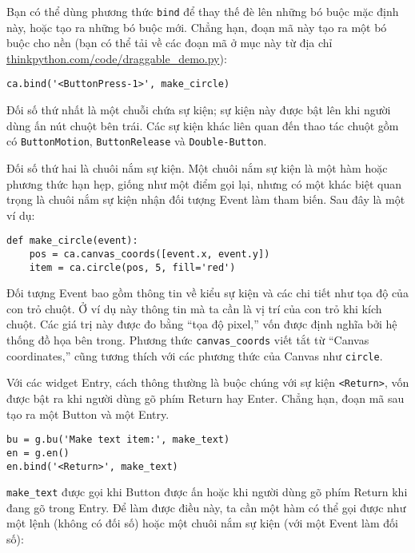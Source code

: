 \documentclass[11pt]{book}
\begin{document}
Bạn có thể dùng phương thức {\tt bind} để thay thế đè lên những
bó buộc mặc định này, hoặc tạo ra những bó buộc mới. Chẳng hạn,
đoạn mã này tạo ra một bó buộc cho nền (bạn có thể tải về các
đoạn mã ở mục này từ địa chỉ \url{thinkpython.com/code/draggable_demo.py}):

\beforeverb
\begin{verbatim}
ca.bind('<ButtonPress-1>', make_circle)
\end{verbatim}
\afterverb
%
Đối số thứ nhất là một chuỗi chứa sự kiện; sự kiện này được
bật lên khi người dùng ấn nút chuột bên trái. Các sự kiện khác
liên quan đến thao tác chuột gồm có {\tt ButtonMotion}, {\tt ButtonRelease} và
{\tt Double-Button}.


Đối số thứ hai là chuôi nắm sự kiện. Một chuôi nắm sự kiện là một
hàm hoặc phương thức hạn hẹp, giống như một điểm gọi lại, nhưng có một
khác biệt quan trọng là chuôi nắm sự kiện nhận đối tượng Event làm
tham biến. Sau đây là một ví dụ:

\beforeverb
\begin{verbatim}
def make_circle(event):
    pos = ca.canvas_coords([event.x, event.y])
    item = ca.circle(pos, 5, fill='red')
\end{verbatim}
\afterverb
%
Đối tượng Event bao gồm thông tin về kiểu sự kiện và các chi tiết như
tọa độ của con trỏ chuột. Ở ví dụ này thông tin mà ta cần là
vị trí của con trỏ khi kích chuột. Các giá trị này được đo bằng
``tọa độ pixel,'' vốn được định nghĩa bởi 
hệ thống đồ họa bên trong. Phương thức \verb"canvas_coords"
viết tắt từ ``Canvas coordinates,'' cũng tương thích với các 
phương thức của Canvas như {\tt circle}.


Với các widget Entry, cách thông thường là buộc chúng với sự kiện \verb"<Return>",
vốn được bật ra khi người dùng gõ phím {\sf Return} hay
{\sf Enter}. Chẳng hạn, đoạn mã sau tạo ra một Button
và một Entry.

\beforeverb
\begin{verbatim}
bu = g.bu('Make text item:', make_text)
en = g.en()
en.bind('<Return>', make_text)
\end{verbatim}
\afterverb
%
\verb"make_text" được gọi khi Button được ấn hoặc khi 
người dùng gõ phím {\sf Return} khi đang gõ trong Entry.  Để làm
được điều này, ta cần một hàm có thể gọi được như một lệnh 
(không có đối số) hoặc một chuôi nắm sự kiện (với một Event
làm đối số):
\end{document}
